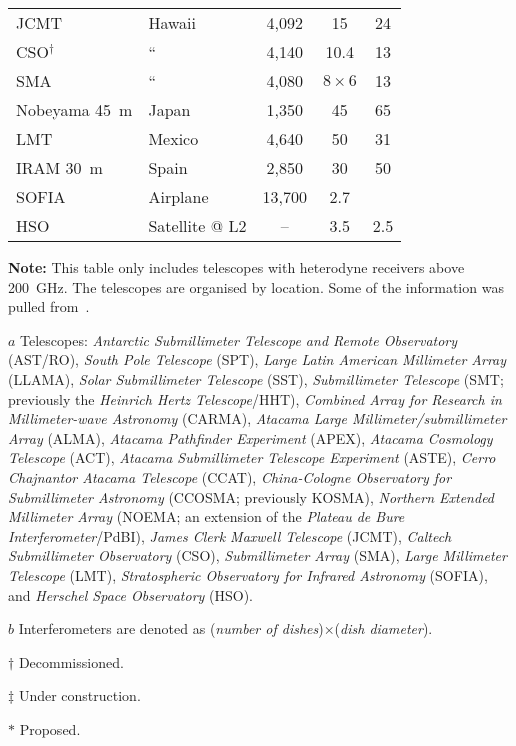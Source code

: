 \begin{table}[!p]
\begin{threeparttable}
\begin{tabular}{llccc}
JCMT             & Hawaii   & 4,092         & 15            & 24   \\
CSO$^\dagger$    & ``       & 4,140         & 10.4          & 13   \\ 
SMA              & ``       & 4,080         & $8\times6$    & 13   \\
Nobeyama 45~m    & Japan    & 1,350         & 45            & 65   \\
LMT              & Mexico   & 4,640         & 50            & 31   \\
IRAM 30~m        & Spain    & 2,850         & 30            & 50   \\ \midrule
SOFIA            & Airplane & 13,700        & 2.7           &      \\
HSO              & Satellite @ L2 & --      & 3.5           & 2.5  \\ \bottomrule
\end{tabular}
\begin{tablenotes}\footnotesize
\item[] \textbf{Note:} This table only includes telescopes with heterodyne receivers above 200~GHz. The telescopes are organised by location. Some of the information was pulled from~\cite{Graham2013}.
\item[$a$] Telescopes: 
\emph{Antarctic Submillimeter Telescope and Remote Observatory} (AST/RO), 
\emph{South Pole Telescope} (SPT), 
\emph{Large Latin American Millimeter Array} (LLAMA),
\emph{Solar Submillimeter Telescope} (SST),
\emph{Submillimeter Telescope} (SMT; previously the \emph{Heinrich Hertz Telescope}/HHT), 
\emph{Combined Array for Research in Millimeter-wave Astronomy} (CARMA),
\emph{Atacama Large Millimeter/submillimeter Array} (ALMA),
\emph{Atacama Pathfinder Experiment} (APEX),
\emph{Atacama Cosmology Telescope} (ACT),
\emph{Atacama Submillimeter Telescope Experiment} (ASTE),
\emph{Cerro Chajnantor Atacama Telescope} (CCAT),
\emph{China-Cologne Observatory for Submillimeter Astronomy} (CCOSMA; previously KOSMA),
\emph{Northern Extended Millimeter Array} (NOEMA; an extension of the \emph{Plateau de Bure Interferometer}/PdBI),
\emph{James Clerk Maxwell Telescope} (JCMT), 
\emph{Caltech Submillimeter Observatory} (CSO),
\emph{Submillimeter Array} (SMA), 
\emph{Large Millimeter Telescope} (LMT), 
\emph{Stratospheric Observatory for Infrared Astronomy} (SOFIA), and
\emph{Herschel Space Observatory} (HSO).
\item[$b$] Interferometers are denoted as (\emph{number of dishes})$\times$(\emph{dish diameter}).
\item[$\dagger$] Decommissioned.
\item[$\ddagger$] Under construction.
\item[$*$] Proposed.
\end{tablenotes}
\end{threeparttable}
\end{table}

